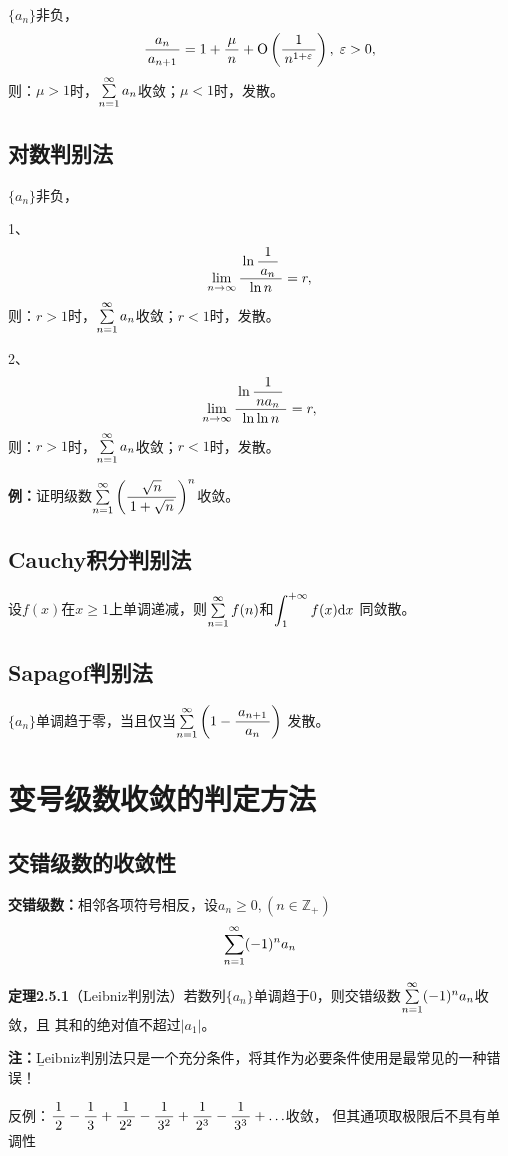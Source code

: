 \begin{shaded}
$\{a_n\}$非负，
$$\df{a_n}{a_{n+1}}=1+\df{\mu}n+\mathrm{O}\left(\df1{n^{1+\e}}\right),\;\e>0,$$
则：$\mu>1$时，$\sumn a_n$收敛；$\mu<1$时，发散。

\subsection*{对数判别法}

$\{a_n\}$非负，

1、
$$\limn\df{\ln\df1{a_n}}{\ln n}=r,$$
则：$r>1$时，$\sumn a_n$收敛；$r<1$时，发散。

2、
$$\limn\df{\ln\df1{na_n}}{\ln\ln n}=r,$$
则：$r>1$时，$\sumn a_n$收敛；$r<1$时，发散。

{\bf 例：}证明级数$\sumn\left(\df{\sqrt n}{1+\sqrt n}\right)^n$收敛。

\subsection*{Cauchy积分判别法}

设$f(x)$在$x\geq 1$上单调递减，则$\sumn f(n)$和$\dint_1^{+\infty}f(x)\d x$
同敛散。

\subsection*{Sapagof判别法}

$\{a_n\}$单调趋于零，当且仅当$\sumn\left(1-\df{a_{n+1}}{a_n}\right)$
发散。

\end{shaded}

\section{变号级数收敛的判定方法}

\subsection{交错级数的收敛性}

{\bf 交错级数：}相邻各项符号相反，设$a_n\geq 0,(n\in\mathbb{Z}_+)$
$$\sumn(-1)^na_n$$

{\bf 定理2.5.1}（Leibniz判别法）若数列$\{a_n\}$单调趋于$0$，则交错级数$\sumn (-1)^na_n$收敛，且
其和的绝对值不超过$|a_1|$。

{\bf 注：}{\b Leibniz判别法只是一个充分条件，将其作为必要条件使用是最常见的一种错误！}

反例：$\df12-\df13+\df1{2^2}-\df1{3^2}+\df1{2^3}-\df1{3^3}+\ldots$收敛，
但其通项取极限后不具有单调性

